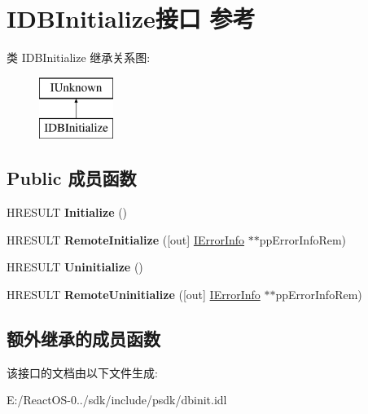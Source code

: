 \hypertarget{interface_i_d_b_initialize}{}\section{I\+D\+B\+Initialize接口 参考}
\label{interface_i_d_b_initialize}
类 I\+D\+B\+Initialize 继承关系图\+:\begin{figure}[H]
\begin{center}
\leavevmode
\includegraphics[height=2.000000cm]{interface_i_d_b_initialize}
\end{center}
\end{figure}
\subsection*{Public 成员函数}
\begin{DoxyCompactItemize}
\item 
\mbox{\label{interface_i_d_b_initialize_a4b79d9fb09d518e7c7c0c356f416ad63}} 
H\+R\+E\+S\+U\+LT {\bfseries Initialize} ()
\item 
\mbox{\label{interface_i_d_b_initialize_ae0c44bd34d2e578323e2ac09c435e3fd}} 
H\+R\+E\+S\+U\+LT {\bfseries Remote\+Initialize} (\mbox{[}out\mbox{]} \hyperlink{interface_i_error_info}{I\+Error\+Info} $\ast$$\ast$pp\+Error\+Info\+Rem)
\item 
\mbox{\label{interface_i_d_b_initialize_a796520ffb3dabbfb7902f45cc57506ff}} 
H\+R\+E\+S\+U\+LT {\bfseries Uninitialize} ()
\item 
\mbox{\label{interface_i_d_b_initialize_a5968167373b19c3cfec900942e6b0c69}} 
H\+R\+E\+S\+U\+LT {\bfseries Remote\+Uninitialize} (\mbox{[}out\mbox{]} \hyperlink{interface_i_error_info}{I\+Error\+Info} $\ast$$\ast$pp\+Error\+Info\+Rem)
\end{DoxyCompactItemize}
\subsection*{额外继承的成员函数}


该接口的文档由以下文件生成\+:\begin{DoxyCompactItemize}
\item 
E\+:/\+React\+O\+S-\/0../sdk/include/psdk/dbinit.\+idl\end{DoxyCompactItemize}
